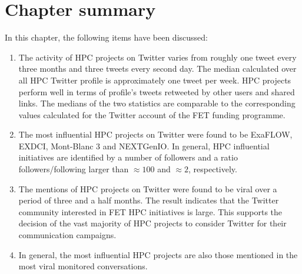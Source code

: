 \section{Chapter summary}
In this chapter, the following items have been discussed:

\begin{enumerate}
 \item The activity of HPC projects on Twitter varies from roughly one tweet every three months and three tweets every second day. The median calculated over all HPC Twitter profile is approximately one tweet per week. HPC projects perform well in terms of profile's tweets retweeted by other users and shared links. The medians of the two statistics are comparable to the corresponding values calculated for the Twitter account of the FET funding programme.
 \item The most influential HPC projects on Twitter were found to be ExaFLOW, EXDCI, Mont-Blanc 3 and NEXTGenIO. In general, HPC influential initiatives are identified by a number of followers and a ratio followers/following larger than $\approx 100$ and $\approx 2$, respectively. 
 \item The mentions of HPC projects on Twitter were found to be viral over a period of three and a half months. The result indicates that the Twitter community interested in FET HPC initiatives is large. This supports the decision of the vast majority of HPC projects to consider Twitter for their communication campaigns.
 \item In general, the most influential HPC projects are also those mentioned in the most viral monitored conversations.    
\end{enumerate}  


